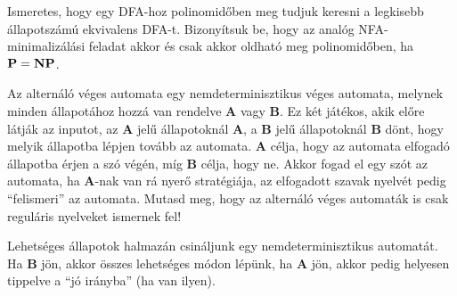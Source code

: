 	
	\begin{Exercise}[counter={sorszam}, difficulty=1]
		Ismeretes, hogy egy DFA-hoz polinomidőben meg tudjuk keresni a legkisebb
		állapotszámú ekvivalens DFA-t. Bizonyítsuk be, hogy az analóg NFA-minimalizálási feladat
		akkor és csak akkor oldható meg polinomidőben, ha $\mbox{\ensuremath{\mathbf{P}}} = \mbox{\ensuremath{\mathbf{NP}}}$.
		
	\end{Exercise}

	
	
	\begin{Exercise}[counter={sorszam}, difficulty=1]
	Az altern\'al\'o v\'eges automata egy nemdeterminisztikus v\'eges automata, melynek minden állapotához hozzá van rendelve {\bf A} vagy {\bf B}. Ez két játékos, akik előre látják az inputot, az {\bf A} jelű állapotoknál {\bf A}, a {\bf B} jelű állapotoknál {\bf B} dönt, hogy melyik állapotba lépjen tovább az automata. {\bf A} célja, hogy az automata elfogadó állapotba érjen a szó végén, míg {\bf B} célja, hogy ne. Akkor fogad el egy szót az automata, ha {\bf A}-nak van rá nyerő stratégiája, az elfogadott szavak nyelvét pedig ``felismeri'' az automata. Mutasd meg, hogy az altern\'al\'o v\'eges automaták is csak reguláris nyelveket ismernek fel!
\end{Exercise}	 
\begin{Answer}
	Lehets\'eges \'allapotok halmaz\'an csin\'aljunk egy nemdeterminisztikus automat\'at. Ha {\bf B} j\"on, akkor \"osszes lehets\'eges m\'odon l\'ep\"unk, ha {\bf A} j\"on, akkor pedig helyesen tippelve a ``j\'o ir\'anyba'' (ha van ilyen).
\end{Answer}
	
